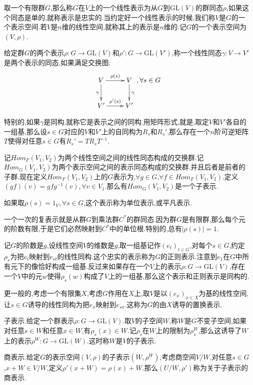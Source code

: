 取一个有限群$G$,那么称$G$在$V$上的一个线性表示为从$G$到$\mathrm{GL}(V)$的群同态$\rho$,如果这个同态是单的,就称表示是忠实的.当约定好一个线性表示的时候,我们称$V$是$G$的一个表示空间.若$V$是$n$维的线性空间,就称其上的表示是$n$维的.记$G$的一个表示空间为$(V,\rho)$.

给定群$G$的两个表示$\rho:G\to\mathrm{GL}(V)$和$\rho':G\to\mathrm{GL}(V')$,称一个线性同态$\gamma:V\to V'$是两个表示的同态,如果满足交换图:
$$\xymatrix{
V\ar[r]^{\rho(s)}\ar[d]_{\gamma}&V\ar[d]^{\gamma}\\
V'\ar[r]^{\rho'(s)}&V'
},\forall s\in G$$

特别的,如果$\gamma$是同构,就称它是表示之间的同构.用矩阵形式,就是,取定$V$和$V'$各自的一组基,那么设$s\in G$对应的$V$和$V'$上的自同构为$R_s$和$R_s'$,那么存在一个$n$阶可逆矩阵$T$使得对任意$s\in G$有$R_s'=TR_sT^{-1}$.

记$Hom_F(V_1,V_2)$为两个线性空间之间的线性同态构成的交换群.记$Hom_G(V_1,V_2)$为两个表示空间之间的表示同态构成的交换群.并且后者是前者的子群.现在定义$Hom_F(V_1,V_2)$上的$G$表示为,$\forall g\in G$,$\forall f\in Hom_F(V_1,V_2)$.定义$(gf)(v)=gfg^{-1}(v),\forall v\in V_1$.那么有$Hom_G(V_1,V_2)$是一个子表示.

如果取$\rho(s)=1_V,\forall s\in G$,这个表示称为单位表示,或平凡表示.

一个一次的复表示就是从群$G$到乘法群$C^*$的群同态.因为群$G$是有限群,那么每个元的阶数有限,于是它们必然映射到$C^*$中的单位根.特别的,总有$|\rho(s)|=1$.

记$G$的阶数是$g$,设线性空间$V$的维数是$g$,取一组基记作$(e_t)_{t\in G}$,对每个$s\in G$,约定$\rho_s$为把$e_t$映射到$e_{st}$的线性同构.这个忠实的表示称为$G$的正则表示.注意到$e_1$在$G$中所有元下的像恰好构成一组基.反过来如果存在一个$V$上的表示$\rho:G\to\mathrm{GL}(V)$,存在一个$V$中的元$w$使得$\rho_s(w)$构成了$V$上的一组基,那么这个表示和正则表示是同构的.

更一般的,考虑一个有限集$X$,考虑$G$作用在$X$上,取$V$是以$(e_x)_{x\in X}$为基的线性空间,让$s\in G$诱导的线性同构为把$e_x$映射到$e_{sx}$.这称为$G$的由$X$诱导的置换表示.

子表示.给定一个群表示$\rho:G\to\mathrm{GL}(V)$.取$V$的子空间$W$,称$W$是$G$不变子空间,如果对任意$s\in W$和任意$x\in W$,有$\rho_s(x)\in W$.记$\rho_s$在$W$上的限制为$\rho_s^W$,那么这诱导了$W$上的表示$\rho^W:G\to\mathrm{GL}(W)$.这时称$W$是$V$的子表示.

商表示.给定$G$的表示空间$(V,\rho)$的子表示$(W,\rho^W)$,考虑商空间$V/W$,对任意$s\in G$,$x+W\in V/W$,定义$\rho'(x+W)=\rho(x)+W$.那么$(U/W,\rho')$称为关于子表示的商表示.

